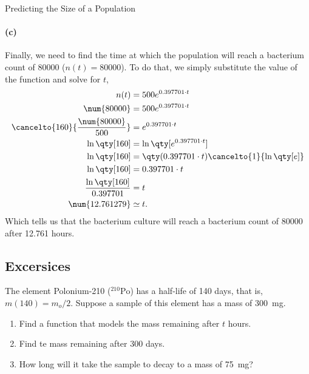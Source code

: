 \documentclass[../main.tex]{subfiles}
\begin{document}
\begin{example}{Predicting the Size of a Population}{}
    \paragraph{(c)} Finally, we need to find the time at which the population will reach a bacterium count of \num{80000} ($n(t)=\num{80000}$).
    To do that, we simply substitute the value of the function and solve for  $t$,
    \begin{align*}
        n(t) &= 500e^{0.397701\cdot t} \\
        \num{80000} &= 500e^{0.397701\cdot t} \\
        \cancelto{160}{\frac{\num{80000}}{500}} &= e^{0.397701\cdot t} \\
        \ln\qty[160] &= \ln\qty[e^{0.397701\cdot t}] \\
        \ln\qty[160] &= \qty(0.397701\cdot t)\cancelto{1}{\ln\qty[e]} \\
        \ln\qty[160] &= 0.397701\cdot t \\
        \frac{\ln\qty[160]}{0.397701} &= t \\
        \num{12.761279} &\simeq t.
    \end{align*}
    Which tells us that the bacterium culture will reach a bacterium count of \num{80000} after \num{12.761} hours.


\end{example}

\subsection{Excersices}

The element Polonium-210 ($^{210}\mathrm{Po}$) has a half-life of \num{140} days, that is, $m(140) = m_o/2$.
Suppose a sample of this element has a mass of \SI{300}{\milli\gram}.
\begin{enumerate}[label=(\alph*)]
    \item Find a function that models the mass remaining after $t$ hours.
    \item Find te mass remaining after \num{300} days. 
    \item How long will it take the sample to decay to a mass of \SI{75}{\milli\gram}?
\end{enumerate}
\end{document}
